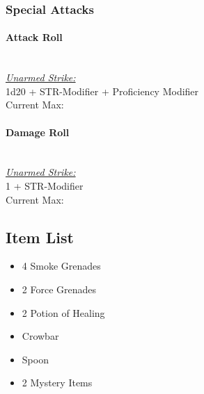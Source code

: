 {\subsubsection*{Special Attacks}
\paragraph*{Attack Roll}\hfill\\
\underline{\textit{Unarmed Strike:}}\\
1d20 + STR-Modifier + Proficiency Modifier\\
\indent Current Max: 
\paragraph*{Damage Roll}\hfill\\
\underline{\textit{Unarmed Strike:}}\\
1 + STR-Modifier\\
\indent Current Max: 

\vfill\eject

\subsection*{Item List}
\begin{itemize}
	\item 4 Smoke Grenades
	\item 2 Force Grenades
	\item 2 Potion of Healing
	\item Crowbar
	\item Spoon
	\item 2 Mystery Items
\end{itemize}
}